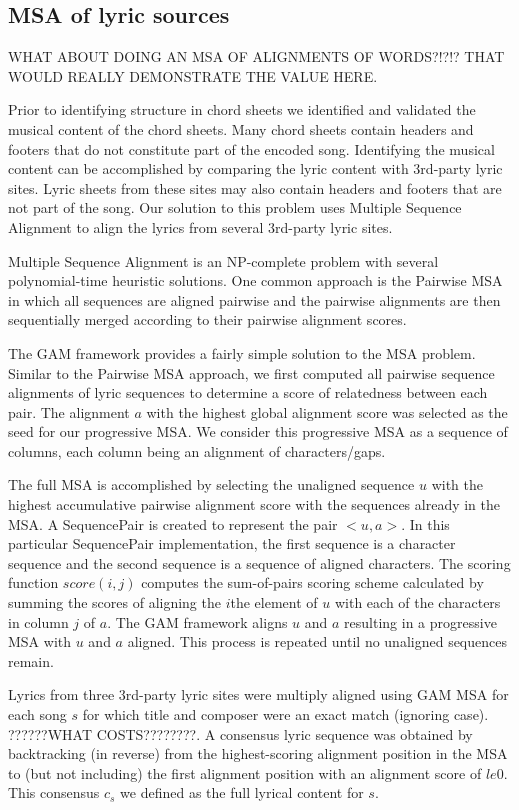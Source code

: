 \documentclass[letterpaper]{article}
\begin{document}
\subsection{MSA of lyric sources}

WHAT ABOUT DOING AN MSA OF ALIGNMENTS OF WORDS?!?!? THAT WOULD REALLY DEMONSTRATE THE VALUE HERE.

Prior to identifying structure in chord sheets we identified and validated the musical content of the chord sheets. Many chord sheets contain headers and footers that do not constitute part of the encoded song. Identifying the musical content can be accomplished by comparing the lyric content with 3rd-party lyric sites. Lyric sheets from these sites may also contain headers and footers that are not part of the song. Our solution to this problem uses Multiple Sequence Alignment to align the lyrics from several 3rd-party lyric sites.

Multiple Sequence Alignment is an NP-complete problem with several polynomial-time heuristic solutions. One common approach is the Pairwise MSA in which all sequences are aligned pairwise and the pairwise alignments are then sequentially merged according to their pairwise alignment scores.

The GAM framework provides a fairly simple solution to the MSA problem. Similar to the Pairwise MSA approach, we first computed all pairwise sequence alignments of lyric sequences to determine a score of relatedness between each pair. The alignment $a$ with the highest global alignment score was selected as the seed for our progressive MSA. We consider this progressive MSA as a sequence of columns, each column being an alignment of characters/gaps. 

The full MSA is accomplished by selecting the unaligned sequence $u$ with the highest accumulative pairwise alignment score with the sequences already in the MSA. A SequencePair is created to represent the pair $<u,a>$. In this particular SequencePair implementation, the first sequence is a character sequence and the second sequence is a sequence of aligned characters. The scoring function $score(i,j)$ computes the sum-of-pairs scoring scheme calculated by summing the scores of aligning the $i$the element of $u$ with each of the characters in column $j$ of $a$. The GAM framework aligns $u$ and $a$ resulting in a progressive MSA with $u$ and $a$ aligned. This process is repeated until no unaligned sequences remain.

Lyrics from three 3rd-party lyric sites were multiply aligned using GAM MSA for each song $s$ for which title and composer were an exact match (ignoring case). ??????WHAT COSTS????????. A consensus lyric sequence was obtained by backtracking (in reverse) from the highest-scoring alignment position in the MSA to (but not including) the first alignment position with an alignment score of $le 0$. This consensus $c_s$ we defined as the full lyrical content for $s$.
\end{document}
